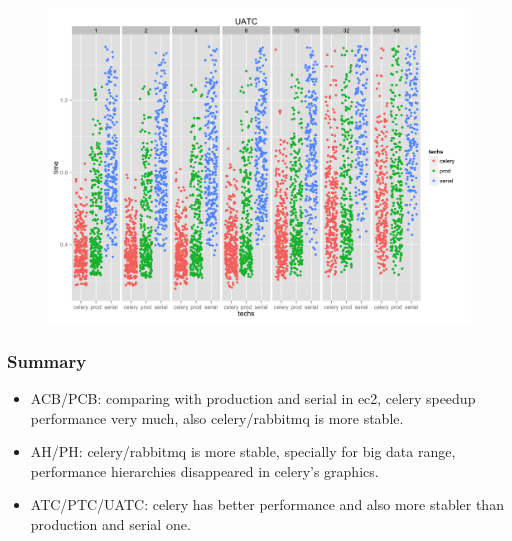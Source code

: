 \documentclass{beamer}
\begin{document}
\begin{frame}
\begin{figure}
\includegraphics[width=\linewidth]{images/UATC.png}
\end{figure}
\end{frame}

\begin{frame}
\frametitle{Summary}
\begin{itemize}
\item ACB/PCB: comparing with production and serial in ec2,  celery speedup performance very much, also celery/rabbitmq is more stable.
\item AH/PH: celery/rabbitmq is more stable, specially for big data range, performance hierarchies disappeared in celery's graphics.
\item ATC/PTC/UATC: celery has better performance and also more stabler than production and serial one.
\end{itemize}
\end{frame}
\end{document}
